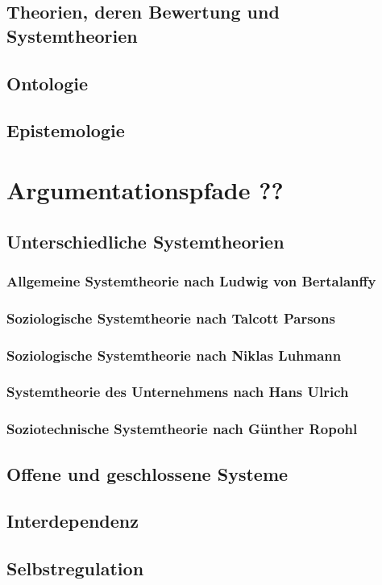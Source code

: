 \documentclass[a4paper,12pt]{article}
\begin{document}
\subsection{Theorien, deren Bewertung und Systemtheorien}
\subsection{Ontologie}
\subsection{Epistemologie}


\section{Argumentationspfade ??}
\subsection{Unterschiedliche Systemtheorien}
\subsubsection{Allgemeine Systemtheorie nach Ludwig von Bertalanffy}
\subsubsection{Soziologische Systemtheorie nach Talcott Parsons}
\subsubsection{Soziologische Systemtheorie nach Niklas Luhmann}
\subsubsection{Systemtheorie des Unternehmens nach Hans Ulrich}
\subsubsection{Soziotechnische Systemtheorie nach Günther Ropohl}

\subsection{Offene und geschlossene Systeme}
\subsection{Interdependenz}
\subsection{Selbstregulation}
\end{document}
